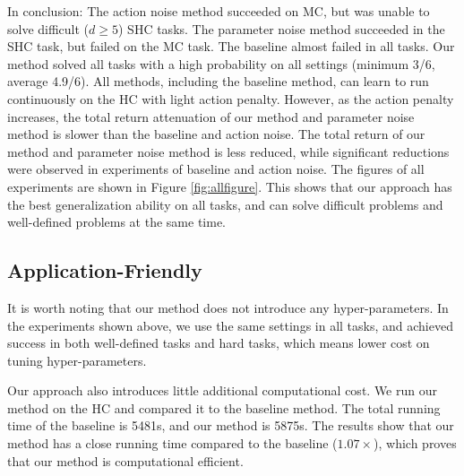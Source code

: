In conclusion: The action noise method succeeded on MC, but was unable to solve difficult ($d\ge5$) SHC tasks. The parameter noise method succeeded in the SHC task, but failed on the MC task. The baseline almost failed in all tasks. Our method solved all tasks with a high probability on all settings (minimum 3/6, average 4.9/6). All methods, including the baseline method, can learn to run continuously on the HC with light action penalty. However, as the action penalty increases, the total return attenuation of our method and parameter noise method is slower than the baseline and action noise. The total return of our method and parameter noise method is less reduced, while significant reductions were observed in experiments of baseline and action noise. The figures of all experiments are shown in Figure \ref{fig:allfigure}. This shows that our approach has the best generalization ability on all tasks, and can solve difficult problems and well-defined problems at the same time.

\subsection{Application-Friendly}
It is worth noting that our method does not introduce any hyper-parameters. In the experiments shown above, we use the same settings in all tasks, and achieved success in both well-defined tasks and hard tasks, which means lower cost on tuning hyper-parameters.
   
 Our approach also introduces little additional computational cost. We run our method on the HC and compared it to the baseline method. The total running time of the baseline is 5481s, and our method is 5875s. The results show that our method has a close running time compared to the baseline ($1.07\times$), which proves that our method is computational efficient.